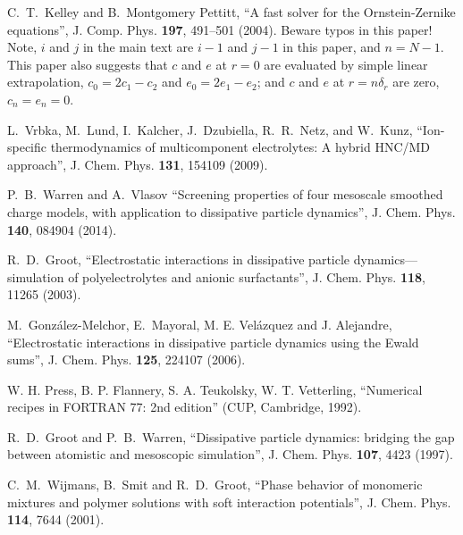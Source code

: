 \documentclass[12pt,a4paper]{article}
\begin{document}
 C.~T.~Kelley and B.~Montgomery Pettitt, ``A fast
  solver for the Ornstein-Zernike equations'',
  J. Comp. Phys. {\bf197}, 491--501 (2004).  Beware typos in this
  paper!  Note, $i$ and $j$ in the main text are $i-1$ and $j-1$ in
  this paper, and $n = N-1$.  This paper also suggests that $c$ and
  $e$ at $r = 0$ are evaluated by simple linear extrapolation, $c_0 =
  2 c_1 - c_2$ and $e_0 = 2 e_1 - e_2$; and $c$ and $e$ at $r =
  n\delta_r$ are zero, $c_n = e_n = 0$.

 L.~Vrbka, M.~Lund, I.~Kalcher, J.~Dzubiella,
  R.~R.~Netz, and W.~Kunz, ``Ion-specific thermodynamics of
  multicomponent electrolytes: A hybrid HNC/MD approach'',
  J. Chem. Phys. {\bf131}, 154109 (2009).
  
 P.~B.~Warren and A.~Vlasov ``Screening properties of
  four mesoscale smoothed charge models, with application to
  dissipative particle dynamics'', J. Chem. Phys. {\bf140}, 084904
  (2014).

R.~D.~Groot, ``Electrostatic interactions in
  dissipative particle dynamics---simulation of polyelectrolytes and
  anionic surfactants'', J. Chem. Phys. {\bf118}, 11265 (2003).

M.~Gonz\'alez-Melchor, E.~Mayoral, M. E. Vel\'azquez
  and J. Alejandre, ``Electrostatic interactions in dissipative
  particle dynamics using the Ewald sums'', J. Chem. Phys. {\bf125},
  224107 (2006).

 W. H. Press, B. P. Flannery, S. A. Teukolsky,
  W. T. Vetterling, ``Numerical recipes in FORTRAN 77: 2nd edition''
  (CUP, Cambridge, 1992).

 R.~D.~Groot and P.~B.~Warren, ``Dissipative particle
  dynamics: bridging the gap between atomistic and mesoscopic
  simulation'', J. Chem. Phys. {\bf107}, 4423 (1997).

 C.~M.~Wijmans, B.~Smit and R.~D.~Groot, ``Phase
  behavior of monomeric mixtures and polymer solutions with soft
  interaction potentials'', J. Chem. Phys. {\bf114}, 7644 (2001).
\end{document}
